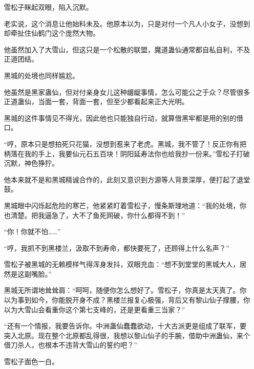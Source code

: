 \begin{this_body}
雪松子眯起双眼，陷入沉默。

老实说，这个消息让他始料未及。他原本以为，只是对付一个凡人小女子，没想到却牵扯住仙鹤门这个庞然大物。

他虽然加入了大雪山，但这只是一个松散的联盟，魔道蛊仙通常都自私自利，不及正道团结。

黑城的处境也同样尴尬。

他虽然是黑家蛊仙，但对付亲身女儿这种龌龊事情，怎么可能公之于众？尽管很多正道蛊仙，当面一套，背面一套，但至少都看起来正大光明。

黑城的这件事情见不得光，因此他也只能独自行动，就算借黑牢都是用的别的借口。

“哼，原本只是想拍死只花猫，没想到惹来了老虎。黑城，我不管了！反正你有把柄落在我的手上，我要仙元石五百块！阴阳延寿法你也给我抄一份来。”雪松子打破沉默，神色狰狞。

他本来就不是和黑城精诚合作的，此刻又意识到方源等人背景深厚，便打起了退堂鼓。

黑城眼中闪烁起危险的寒芒，他紧紧盯着雪松子，慢条斯理地道：“我的处境，你也清楚。把我逼急了，大不了鱼死网破，你什么都得不到！”

“你！你就不怕……”

“哼，我抓不到黑楼兰，汲取不到寿命，都快要死了，还顾得上什么名声？”

雪松子被黑城的无赖模样气得浑身发抖，双眼充血：“想不到堂堂的黑城大人，居然是这副嘴脸。”

黑城无所谓地耸耸肩：“呵呵，随便你怎么想好了。雪松子，你真是太天真了。你以为事到如今，你能脱开身不成？黑楼兰报复心极强，背后又有黎山仙子撑腰，你以为大雪山会看重你这个第七支峰的，还是更看重三当家？”

“还有一个情报，我要告诉你。中洲蛊仙蠢蠢欲动，十大古派更是组成了联军，要突入北原。现在整个北原都乱得很，我想以黎山仙子的手腕，借助中洲蛊仙，来个借刀杀人，也根本不违背大雪山的誓约吧？”

雪松子面色一白。

\end{this_body}

